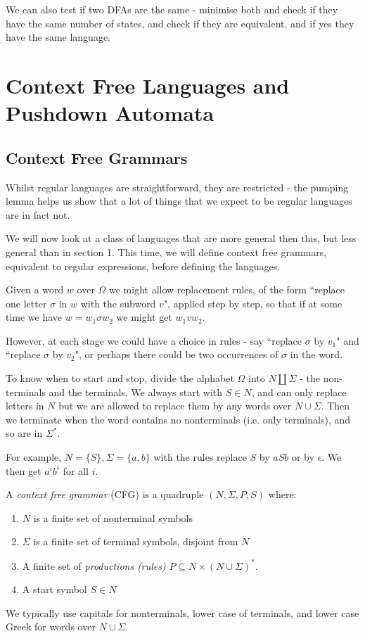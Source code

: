 \documentclass[10pt,a4paper]{article}
\begin{document}
We can also test if two DFAs are the same - minimise both and check if they have the same number of states, and check if they are equivalent, and if yes they have the same language.

\section{Context Free Languages and Pushdown Automata}
\subsection*{Context Free Grammars}
Whilst regular languages are straightforward, they are restricted - the pumping lemma helps us show that a lot of things that we expect to be regular languages are in fact not.

We will now look at a class of languages that are more general then this, but less general than in section 1. This time, we will define context free grammars, equivalent to regular expressions, before defining the languages.

Given a word $w$ over $\Omega$ we might allow replacement rules, of the form ``replace one letter $\sigma$ in $w$ with the subword $v$", applied step by step, so that if at some time we have $w = w_1\sigma w_2$ we might get $w_1 v w_2$.

However, at each stage we could have a choice in rules - say ``replace $\sigma$ by $v_1$" and ``replace $\sigma$ by $v_2$", or perhaps there could be two occurrences of $\sigma$ in the word.

To know when to start and stop, divide the alphabet $\Omega$ into $N\coprod \Sigma$ - the non-terminals and the terminals. We always start with $S \in N$, and can only replace letters in $N$ but we are allowed to replace them by any words over $N \cup \Sigma$. Then we terminate when the word contains no nonterminals (i.e. only terminals), and so are in $\Sigma^{\ast}$.

For example, $N = \{S\}, \Sigma = \{a,b\}$ with the rules replace $S$ by $aSb$ or by $\epsilon$. We then get $a^ib^i$ for all $i$.

A \emph{context free grammar} (CFG) is a quadruple $(N, \Sigma, P, S)$ where:
\begin{enumerate}
\item $N$ is a finite set of nonterminal symbols
\item $\Sigma$ is a finite set of terminal symbols, disjoint from $N$
\item A finite set of \emph{productions (rules)} $P \subseteq N \times (N\cup \Sigma)^{\ast}$.
\item A start symbol $S \in N$
\end{enumerate}
We typically use capitals for nonterminals, lower case of terminals, and lower case Greek for words over $N \cup \Sigma$.
\end{document}
